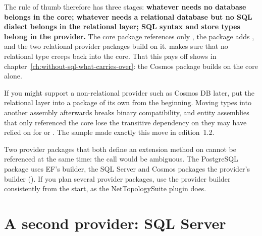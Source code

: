 The rule of thumb therefore has three stages: \textbf{whatever needs no database belongs in
the core; whatever needs a relational database but no SQL dialect belongs in the relational
layer; SQL syntax and store types belong in the provider.} The core package references only
, the package
adds ,
and the two relational provider packages build on it. 
makes sure that no relational type creeps back into the core. That this pays off shows in
chapter~\ref{ch:without-sql-what-carries-over}: the Cosmos package builds on the core alone.

\begin{note}
  If you might support a non-relational provider such as Cosmos DB later, put the relational
  layer into a package of its own from the beginning. Moving types into another assembly
  afterwards breaks binary compatibility, and entity assemblies that only referenced the core
  lose the transitive dependency on
  they may have relied on for  or
  . The sample made exactly this move in
  edition~1.2.
\end{note}

\begin{important}
  Two provider packages that both define an extension method
   on
   cannot be referenced
  at the same time: the call would be ambiguous. The PostgreSQL package uses EF's builder,
  the SQL Server and Cosmos packages the provider's builder
  (). If you plan
  several provider packages, use the provider builder consistently from the start, as the
  NetTopologySuite plugin does.
\end{important}

\chapter{A second provider: SQL Server}\label{ch:a-second-provider-sql-server}

